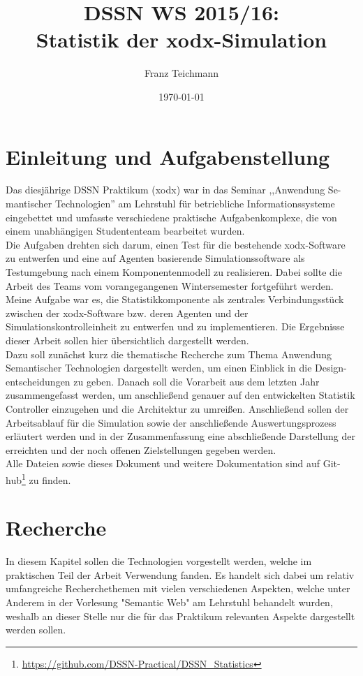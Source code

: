 \documentclass{article}
\title{DSSN WS 2015/16: \\ Statistik der xodx-Simulation}
\author{Franz Teichmann}
\date{\today}
\begin{document}
\maketitle

\tableofcontents
\newpage

\section{Einleitung und Aufgabenstellung}

Das diesjährige DSSN Praktikum (xodx) war in das Seminar ,,Anwendung Se-mantischer Technologien'' am Lehrstuhl für betriebliche Informationssysteme eingebettet und umfasste verschiedene praktische Aufgabenkomplexe, die von einem unabhängigen Studententeam bearbeitet wurden.\\
Die Aufgaben drehten sich darum, einen Test für die bestehende xodx-Software zu entwerfen und eine auf Agenten basierende Simulationssoftware als Testumgebung nach einem Komponentenmodell zu realisieren. Dabei sollte die Arbeit des Teams vom vorangegangenen Wintersemester fortgeführt werden.\\
Meine Aufgabe war es, die Statistikkomponente als zentrales Verbindungsstück zwischen der xodx-Software bzw. deren Agenten und der Simulationskontrolleinheit zu entwerfen und zu implementieren. Die Ergebnisse dieser Arbeit sollen hier übersichtlich dargestellt werden.\\
Dazu soll zunächst kurz die thematische Recherche zum Thema Anwendung Semantischer Technologien dargestellt werden, um einen Einblick in die Design-entscheidungen zu geben. Danach soll die Vorarbeit aus dem letzten Jahr zusammengefasst werden, um anschließend genauer auf den entwickelten Statistik Controller einzugehen und die Architektur zu umreißen. Anschließend sollen der Arbeitsablauf für die Simulation sowie der anschließende Auswertungsprozess erläutert werden und in der Zusammenfassung eine abschließende Darstellung der erreichten und der noch offenen Zielstellungen gegeben werden.\\
Alle Dateien sowie dieses Dokument und weitere Dokumentation sind auf Git-hub\footnote{\url{https://github.com/DSSN-Practical/DSSN_Statistics}} zu finden.

\section{Recherche}

In diesem Kapitel sollen die Technologien vorgestellt werden, welche im praktischen Teil der Arbeit Verwendung fanden. Es handelt sich dabei um relativ umfangreiche Recherchethemen mit vielen verschiedenen Aspekten, welche unter Anderem in der Vorlesung "Semantic Web" am Lehrstuhl behandelt wurden, weshalb an dieser Stelle nur die für das Praktikum relevanten Aspekte dargestellt werden sollen.
\end{document}
